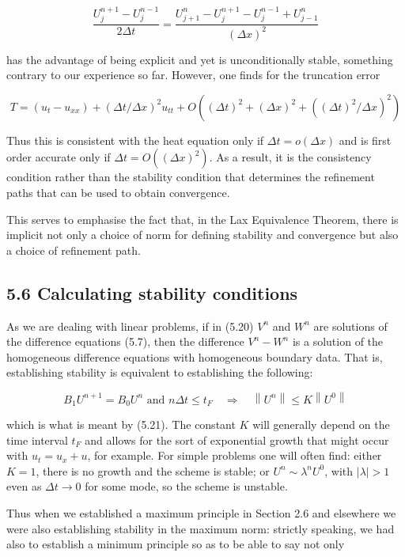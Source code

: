 \documentclass[10pt]{article}
\begin{document}
\[
\frac{U_{j}^{n+1}-U_{j}^{n-1}}{2 \Delta t}=\frac{U_{j+1}^{n}-U_{j}^{n+1}-U_{j}^{n-1}+U_{j-1}^{n}}{(\Delta x)^{2}}
\]

has the advantage of being explicit and yet is unconditionally stable, something contrary to our experience so far. However, one finds for the truncation error

\[
T=\left(u_{t}-u_{x x}\right)+(\Delta t / \Delta x)^{2} u_{t t}+O\left((\Delta t)^{2}+(\Delta x)^{2}+\left((\Delta t)^{2} / \Delta x\right)^{2}\right)
\]

Thus this is consistent with the heat equation only if \(\Delta t=o(\Delta x)\) and is first order accurate only if \(\Delta t=O\left((\Delta x)^{2}\right)\). As a result, it is the consistency condition rather than the stability condition that determines the refinement paths that can be used to obtain convergence.

This serves to emphasise the fact that, in the Lax Equivalence Theorem, there is implicit not only a choice of norm for defining stability and convergence but also a choice of refinement path.

\subsection*{5.6 Calculating stability conditions}
As we are dealing with linear problems, if in (5.20) \(V^{n}\) and \(W^{n}\) are solutions of the difference equations (5.7), then the difference \(V^{n}-W^{n}\) is a solution of the homogeneous difference equations with homogeneous boundary data. That is, establishing stability is equivalent to establishing the following:

\[
B_{1} U^{n+1}=B_{0} U^{n} \text { and } n \Delta t \leq t_{F} \quad \Rightarrow \quad\left\|U^{n}\right\| \leq K\left\|U^{0}\right\|
\]

which is what is meant by (5.21). The constant \(K\) will generally depend on the time interval \(t_{F}\) and allows for the sort of exponential growth that might occur with \(u_{t}=u_{x}+u\), for example. For simple problems one will often find: either \(K=1\), there is no growth and the scheme is stable; or \(U^{n} \sim \lambda^{n} U^{0}\), with \(|\lambda|>1\) even as \(\Delta t \rightarrow 0\) for some mode, so the scheme is unstable.

Thus when we established a maximum principle in Section 2.6 and elsewhere we were also establishing stability in the maximum norm: strictly speaking, we had also to establish a minimum principle so as to be able to say not only
\end{document}
